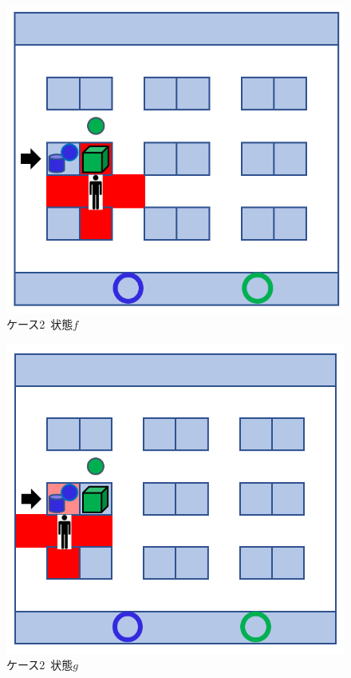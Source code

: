 \begin{figure}[!t]
    \centering
    \includegraphics[scale=0.3]{figures/HITL2_case2_f.png}
    \caption{ケース2\ 状態$f$}
    \label{fig:HITL2_case2_f}
\end{figure}
\begin{figure}[!t]
    \centering
    \includegraphics[scale=0.3]{figures/HITL2_case2_g.png}
    \caption{ケース2\ 状態$g$}
    \label{fig:HITL2_case2_g}
\end{figure}

